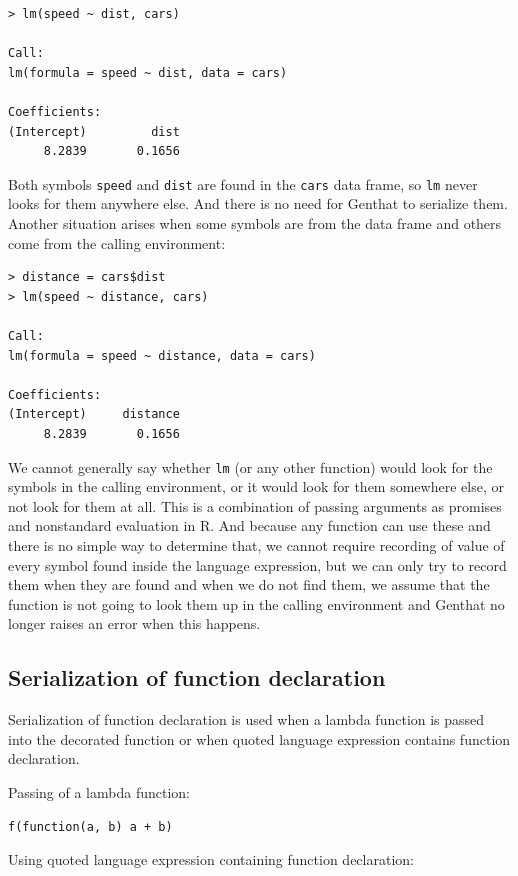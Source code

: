 \documentclass[thesis=B,english]{FITthesis}[2012/10/20]
\begin{document}
\begin{verbatim}
> lm(speed ~ dist, cars)

Call:
lm(formula = speed ~ dist, data = cars)

Coefficients:
(Intercept)         dist
     8.2839       0.1656
\end{verbatim}

Both symbols \verb|speed| and \verb|dist| are found in the \verb|cars| data frame, so \verb|lm| never looks for them anywhere else. And there is no need for Genthat to serialize them. Another situation arises when some symbols are from the data frame and others come from the calling environment:

\begin{verbatim}
> distance = cars$dist
> lm(speed ~ distance, cars)

Call:
lm(formula = speed ~ distance, data = cars)

Coefficients:
(Intercept)     distance
     8.2839       0.1656
\end{verbatim}

We cannot generally say whether \verb|lm| (or any other function) would look for the symbols in the calling environment, or it would look for them somewhere else, or not look for them at all. This is a combination of passing arguments as promises and nonstandard evaluation in R. And because any function can use these and there is no simple way to determine that, we cannot require recording of value of every symbol found inside the language expression, but we can only try to record them when they are found and when we do not find them, we assume that the function is not going to look them up in the calling environment and Genthat no longer raises an error when this happens. 

\subsection{Serialization of function declaration}
Serialization of function declaration is used when a lambda function is passed into the decorated function or when quoted language expression contains function declaration.

Passing of a lambda function:

\begin{verbatim}
f(function(a, b) a + b)
\end{verbatim}

Using quoted language expression containing function declaration:
\end{document}
